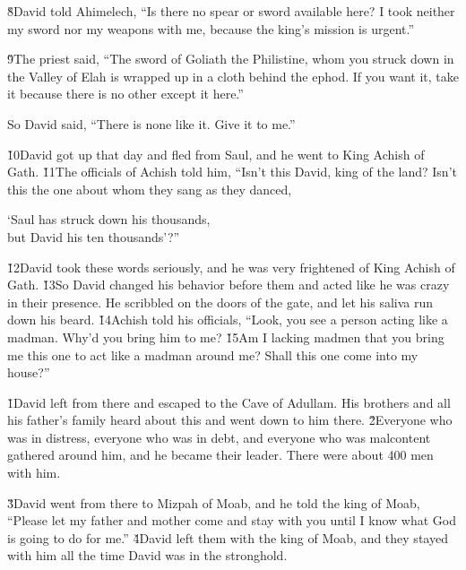 \v{8}David told Ahimelech, ``Is there no spear or sword available here? I took neither my sword nor my weapons with me, because the king's mission is urgent.''

\v{9}The priest said, ``The sword of Goliath the Philistine, whom you struck down in the Valley of Elah is wrapped up in a cloth behind the ephod. If you want it, take it because there is no other except it here.''

So David said, ``There is none like it. Give it to me.''

\v{10}David got up that day and fled from Saul, and he went to King Achish of Gath. \v{11}The officials of Achish told him, ``Isn't this David, king of the land? Isn't this the one about whom they sang as they danced,

\begin{poetry}
\poeml `Saul has struck down his thousands, \\
\poemll    but David his ten thousands'?''
\end{poetry}

\v{12}David took these words seriously, and he was very frightened of King Achish of Gath. \v{13}So David changed his behavior before them and acted like he was crazy in their presence. He scribbled on the doors of the gate, and let his saliva run down his beard. \v{14}Achish told his officials, ``Look, you see a person acting like a madman. Why'd you bring him to me? \v{15}Am I lacking madmen that you bring me this one to act like a madman around me? Shall this one come into my house?''

\v{1}David left from there and escaped to the Cave of Adullam. His brothers and all his father's family heard about this and went down to him there. \v{2}Everyone who was in distress, everyone who was in debt, and everyone who was malcontent gathered around him, and he became their leader. There were about 400 men with him.

\v{3}David went from there to Mizpah of Moab, and he told the king of Moab, ``Please let my father and mother come and stay with you until I know what God is going to do for me.'' \v{4}David left them with the king of Moab, and they stayed with him all the time David was in the stronghold.


